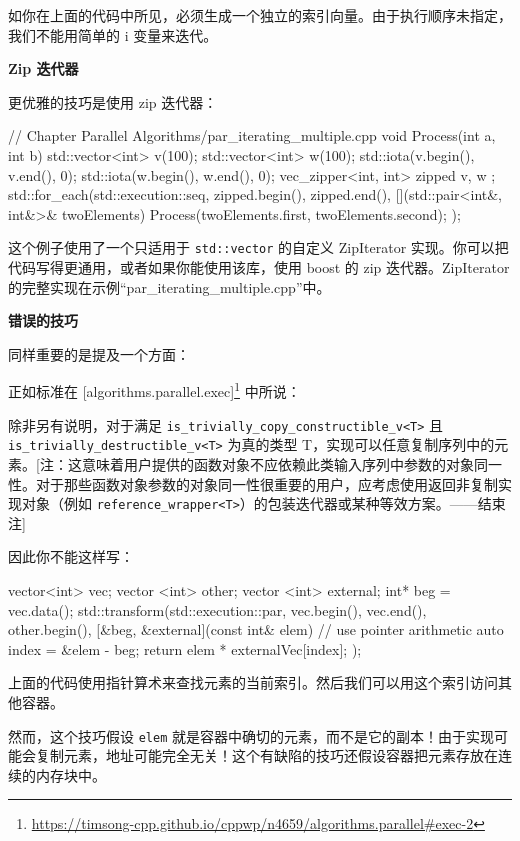 如你在上面的代码中所见，必须生成一个独立的索引向量。由于执行顺序未指定，我们不能用简单的 i 变量来迭代。

\textbf{Zip 迭代器}

更优雅的技巧是使用 zip 迭代器：

\begin{codebox}[cpp]
// Chapter Parallel Algorithms/par_iterating_multiple.cpp
void Process(int a, int b) { }
std::vector<int> v(100);
std::vector<int> w(100);
std::iota(v.begin(), v.end(), 0);
std::iota(w.begin(), w.end(), 0);
vec_zipper<int, int> zipped{ v, w };
std::for_each(std::execution::seq, zipped.begin(), zipped.end(),
[](std::pair<int&, int&>& twoElements) {
Process(twoElements.first, twoElements.second);
}
);
\end{codebox}

这个例子使用了一个只适用于 \texttt{std::vector} 的自定义 ZipIterator 实现。你可以把代码写得更通用，或者如果你能使用该库，使用 boost 的 zip 迭代器。ZipIterator 的完整实现在示例“par\_iterating\_multiple.cpp”中。

\textbf{错误的技巧}

同样重要的是提及一个方面：

正如标准在 [algorithms.parallel.exec]\footnote{\url{https://timsong-cpp.github.io/cppwp/n4659/algorithms.parallel\#exec-2}} 中所说：

除非另有说明，对于满足 \texttt{is\_trivially\_copy\_constructible\_v<T>} 且 \texttt{is\_trivially\_destructible\_v<T>} 为真的类型 T，实现可以任意复制序列中的元素。[注：这意味着用户提供的函数对象不应依赖此类输入序列中参数的对象同一性。对于那些函数对象参数的对象同一性很重要的用户，应考虑使用返回非复制实现对象（例如 \texttt{reference\_wrapper<T>}）的包装迭代器或某种等效方案。——结束注]

因此你不能这样写：

\begin{codebox}[cpp]
vector<int> vec;
vector <int> other;
vector <int> external;
int* beg = vec.data();
std::transform(std::execution::par,
vec.begin(), vec.end(), other.begin(),
[&beg, &external](const int& elem) {
// use pointer arithmetic
auto index = &elem - beg;
return elem * externalVec[index];
}
);
\end{codebox}

上面的代码使用指针算术来查找元素的当前索引。然后我们可以用这个索引访问其他容器。

然而，这个技巧假设 \texttt{elem} 就是容器中确切的元素，而不是它的副本！由于实现可能会复制元素，地址可能完全无关！这个有缺陷的技巧还假设容器把元素存放在连续的内存块中。


